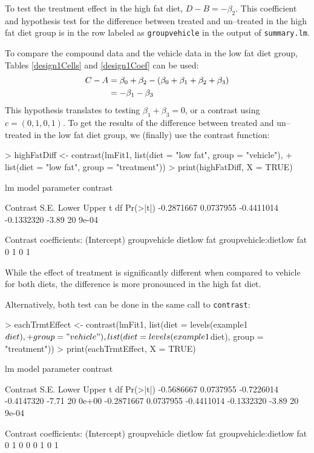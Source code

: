 \documentclass[12pt]{article}
\begin{document}
To test the treatment effect in the high fat diet, $D-B = -\beta_2$. This coefficient and hypothesis test for the difference between treated and un--treated in the high fat diet group is in the row labeled as \texttt{groupvehicle} in the output of \texttt{summary.lm}. 


To compare the compound data and the vehicle data in the low fat diet group, Tables \ref{design1Cells} and \ref{design1Coef} can be used:
\begin{align}
C - A &= 	\beta_0 + \beta_2 -(\beta_0+\beta_1+\beta_2+\beta_{3}) \notag \\
	&= -\beta_1 - \beta_{3} \notag
\end{align}
This hypothesis translates to testing $\beta_1 + \beta_{3} = 0$, or a contrast using $c=(0, 1, 0, 1)$. To get the results of the difference between treated and un--treated in the low fat diet group, we (finally) use the contrast function:
{\small 
\begin{Schunk}
\begin{Sinput}
> highFatDiff <- contrast(lmFit1, list(diet = "low fat", group = "vehicle"), 
+     list(diet = "low fat", group = "treatment"))
> print(highFatDiff, X = TRUE)
\end{Sinput}
\begin{Soutput}
lm model parameter contrast

   Contrast      S.E.      Lower      Upper     t df Pr(>|t|)
 -0.2871667 0.0737955 -0.4411014 -0.1332320 -3.89 20    9e-04

Contrast coefficients:
 (Intercept) groupvehicle dietlow fat groupvehicle:dietlow fat
           0            1           0                        1
\end{Soutput}
\end{Schunk}
}
While the effect of treatment is significantly different when compared to vehicle for both diets, the difference is more pronounced in the high fat diet.

Alternatively, both test can be done in the same call to \texttt{contrast}:

{\small
\begin{Schunk}
\begin{Sinput}
> eachTrmtEffect <- contrast(lmFit1, list(diet = levels(example1$diet), 
+     group = "vehicle"), list(diet = levels(example1$diet), group = "treatment"))
> print(eachTrmtEffect, X = TRUE)
\end{Sinput}
\begin{Soutput}
lm model parameter contrast

   Contrast      S.E.      Lower      Upper     t df Pr(>|t|)
 -0.5686667 0.0737955 -0.7226014 -0.4147320 -7.71 20    0e+00
 -0.2871667 0.0737955 -0.4411014 -0.1332320 -3.89 20    9e-04

Contrast coefficients:
 (Intercept) groupvehicle dietlow fat groupvehicle:dietlow fat
           0            1           0                        0
           0            1           0                        1
\end{Soutput}
\end{Schunk}
}
\end{document}
